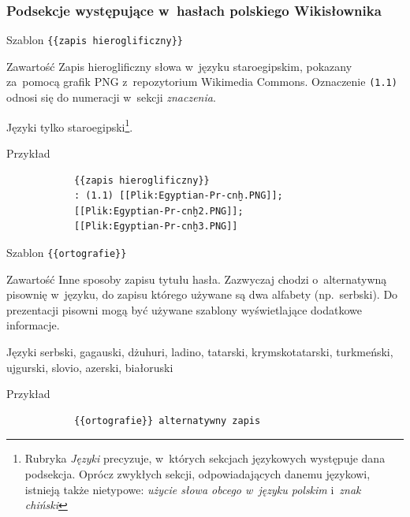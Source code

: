 \documentclass{pracamgr}
\newcommand{\spacer}{
	\begin{center}
		\textasteriskcentered
	\end{center}
}
\newenvironment{description-sub}[0]{
	\begin{basedescript}{\desclabelstyle{\pushlabel}\desclabelwidth{6em}}\setlength{\itemsep}{-2mm}
}{
	\end{basedescript}
}
\begin{document}
\subsubsection{Podsekcje występujące w~hasłach polskiego Wikisłownika}
\begin{description-sub}
	\item[Szablon] \verb|{{zapis hieroglificzny}}|
	\item[Zawartość] Zapis hieroglificzny słowa w~języku staroegipskim, pokazany za~pomocą grafik PNG z~repozytorium Wikimedia Commons. Oznaczenie \texttt{(1.1)} odnosi się do numeracji w~sekcji \emph{znaczenia}.
	\item[Języki] tylko staroegipski\footnote{Rubryka \emph{Języki} precyzuje, w~których sekcjach językowych występuje dana podsekcja. Oprócz zwykłych sekcji, odpowiadających danemu językowi, istnieją także nietypowe: \emph{użycie słowa obcego w~języku polskim} i~\emph{znak chiński}}.
	\item[Przykład]
		\begin{verbatim}
			{{zapis hieroglificzny}}
			: (1.1) [[Plik:Egyptian-Pr-cnḫ.PNG]];
			[[Plik:Egyptian-Pr-cnḫ2.PNG]];
			[[Plik:Egyptian-Pr-cnḫ3.PNG]]
		\end{verbatim}
\end{description-sub}
\spacer
\begin{description-sub}
	\item[Szablon] \verb|{{ortografie}}|
	\item[Zawartość] Inne sposoby zapisu tytułu hasła. Zazwyczaj chodzi o~alternatywną pisownię w~języku, do zapisu którego używane są dwa alfabety (np.\ serbski). Do prezentacji pisowni mogą być używane szablony wyświetlające dodatkowe informacje.
	\item[Języki] serbski, gagauski, dżuhuri, ladino, tatarski, krymskotatarski, turkmeński, ujgurski, slovio, azerski, białoruski
	\item[Przykład]
		\begin{verbatim}
			{{ortografie}} alternatywny zapis
		\end{verbatim}
\end{description-sub}
\spacer
\end{document}
